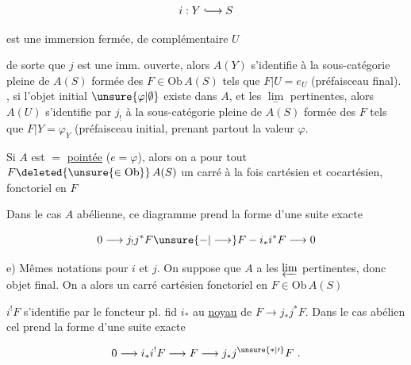 

\[
i:Y\lhook\joinrel\longrightarrow S
\]

est une immersion fermée, de complémentaire $U$


de sorte que $j$ est une imm. ouverte, alors $A(Y)$ s'identifie  à la sous-catégorie pleine de $A(S)$ formée des $F\in\mathrm{Ob}\,A(S)$ tels que $F|U=e_{U}$ (préfaisceau final). , si l'objet initial $\unsure{\varphi|\emptyset}$ existe dans $A$, et les $\underset{-}{\lim}$ pertinentes, alors $A(U)$ s'identifie par $j_{!}$ à la sous-catégorie pleine de $A(S)$ formée des $F$ tels que $F|Y=\varphi_{Y}$ (préfaisceau initial,  prenant partout la valeur $\varphi$.

Si  $A$ est $=$ \uline{pointée} ($e=\varphi$), alors on a pour tout $F\deleted{\unsure{\in\mathrm{Ob}}}\,A(S)$ un carré à la fois cartésien et cocartésien, fonctoriel en $F$


Dans le cas $A$ abélienne, ce diagramme prend la forme d'une suite exacte

\[
0\longrightarrow j_{!}j^{*}F\unsure{-|\longrightarrow}F-i_{*}i^{*}F\longrightarrow0
\]

e) Mêmes notations pour $i$ et $j$. On suppose que $A$ a les $\varprojlim$ pertinentes, donc objet final. On a alors un carré cartésien fonctoriel en $F\in\mathrm{Ob}\,A(S)$


 $i^{!}F$ s'identifie par le foncteur pl. fid $i_{*}$ au \uline{noyau} de $F\longrightarrow j_{*}j^{*}F$. Dans le cas abélien cel prend la forme d'une suite exacte

\[
0\longrightarrow i_{*}i^{!}F\longrightarrow F\longrightarrow j_{*}j^{\unsure{*|\prime}}F\ .
\]

